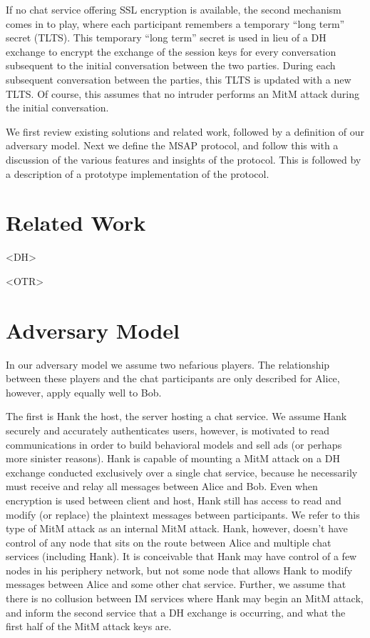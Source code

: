 \documentclass[twoside,10pt]{article}
\begin{document}
\begin{multicols}{2}
If no chat service offering SSL encryption is available, the second mechanism comes in to play, where each participant remembers a temporary ``long term'' secret (TLTS).  This temporary ``long term'' secret is used in lieu of a DH exchange to encrypt the exchange of the session keys for every conversation subsequent to the initial conversation between the two parties.  During each subsequent conversation between the parties, this TLTS is updated with a new TLTS.  Of course, this assumes that no intruder performs an MitM attack during the initial conversation.

We first review existing solutions and related work, followed by a definition of our adversary model.  Next we define the MSAP protocol, and follow this with a discussion of the various features and insights of the protocol.  This is followed by a description of a prototype implementation of the protocol.

\section{Related Work}
<DH>

<OTR>

\section{Adversary Model}
In our adversary model we assume two nefarious players.  The relationship between these players and the chat participants are only described for Alice, however, apply equally well to Bob.

The first is Hank the host, the server hosting a chat service.  We assume Hank securely and accurately authenticates users, however, is motivated to read communications in order to build behavioral models and sell ads (or perhaps more sinister reasons).  Hank is capable of mounting a MitM attack on a DH exchange conducted exclusively over a single chat service, because he necessarily must receive and relay all messages between Alice and Bob.  Even when encryption is used between client and host, Hank still has access to read and modify (or replace) the plaintext messages between participants.  We refer to this type of MitM attack as an internal MitM attack.  Hank, however, doesn't have control of any node that sits on the route between Alice and multiple chat services (including Hank).  It is conceivable that Hank may have control of a few nodes in his periphery network, but not some node that allows Hank to modify messages between Alice and some other chat service.  Further, we assume that there is no collusion between IM services where Hank may begin an MitM attack, and inform the second service that a DH exchange is occurring, and what the first half of the MitM attack keys are.


\end{multicols}
\end{document}
